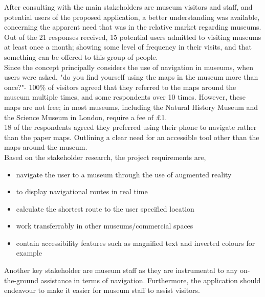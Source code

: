 
After consulting with the main stakeholders are museum visitors and staff, and potential users of the proposed application, a better understanding was available, concerning the apparent need that was in the relative market regarding museums. Out of the 21 responses received, 15 potential users admitted to visiting museums at least once a month; showing some level of frequency in their visits, and that something can be offered to this group of people.\\

Since the concept principally considers the use of navigation in museums, when users were asked, "do you find yourself using the maps in the museum more than once?"- 100\% of visitors agreed that they referred to the maps around the museum multiple times, and some respondents over 10 times. However, these maps are not free; in most museums, including the Natural History Museum and the Science Museum in London, require a fee of £1.\\

18 of the respondents agreed they preferred using their phone to navigate rather than the paper maps. Outlining a clear need for an accessible tool other than the maps around the museum.\\

Based on the stakeholder research, the project requirements are, 

\begin{itemize}
    \item navigate the user to a museum through the use of augmented reality
    \item to display navigational routes in real time
    \item calculate the shortest route to the user specified location 
    \item work transferrably in other museums/commercial spaces
    \item contain accessibility features such as magnified text and inverted colours for example
\end{itemize}

Another key stakeholder are museum staff as they are instrumental to any on-the-ground assistance in terms of navigation. Furthermore, the application should endeavour to make it easier for museum staff to assist visitors.\\


